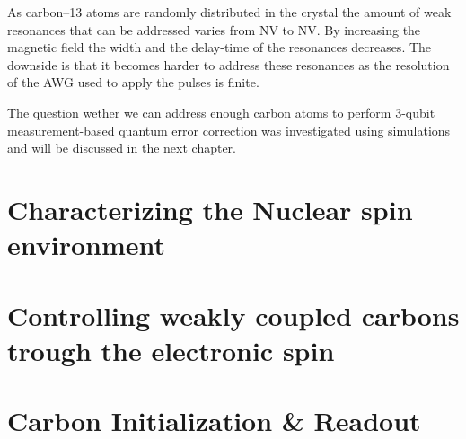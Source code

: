 As carbon--13 atoms are randomly distributed in the crystal the amount of weak resonances that can be addressed varies from NV to NV. By increasing the magnetic field the width and the delay-time of the resonances decreases. The downside is that it becomes harder to address these resonances as the resolution of the AWG used to apply the pulses is finite.

The question wether we can address enough carbon atoms to perform 3-qubit measurement-based quantum error correction was investigated using simulations and will be discussed in the next chapter.

\section{Characterizing the Nuclear spin environment}






\section{Controlling weakly coupled carbons trough the electronic spin}

\section{Carbon Initialization \& Readout}


